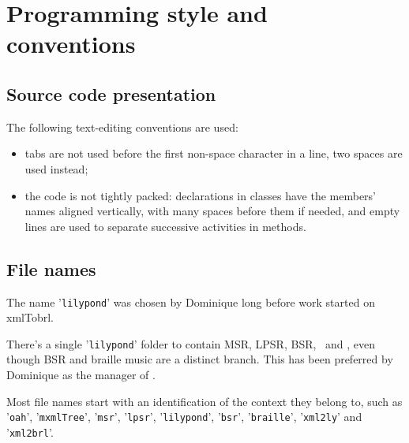 \documentclass[12pt,a4paper]{article}
\begin{document}
\section{Programming style and conventions}

\subsection{Source code presentation}

The following text-editing conventions are used:
\begin{itemize}
\item tabs are not used before the first non-space character in a line, two spaces are used instead;

\item the code is not tightly packed: declarations in classes have the members' names aligned vertically, with many spaces before them if needed, and empty lines are used to separate successive activities in methods.
\end{itemize}

\subsection{File names}

The name '{\tt lilypond}' was chosen by Dominique long before work started on \\xmlTobrl.

There's a single '{\tt lilypond}' folder to contain MSR, LPSR, BSR, \xmlToLy\ and \xmlToBrl, even though BSR and braille music are a distinct branch. This has been preferred by Dominique as the manager of \lib.

Most file names start with an identification of the context they belong to, such as '{\tt oah}', '{\tt mxmlTree}', '{\tt msr}', '{\tt lpsr}', '{\tt lilypond}', '{\tt bsr}', '{\tt braille}', '{\tt xml2ly}' and '{\tt xml2brl}'.
\end{document}
